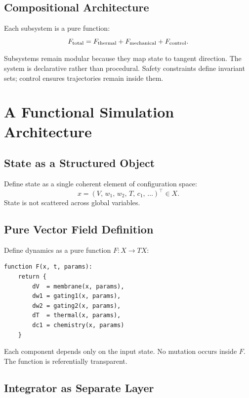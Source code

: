 \documentclass[12pt,openany]{book}
\begin{document}
\section{Compositional Architecture}

Each subsystem is a pure function:
\[
  F_{\rm total} = F_{\rm thermal} + F_{\rm mechanical} + F_{\rm control}.
\]

Subsystems remain modular because they map state to tangent direction.
The system is declarative rather than procedural. Safety constraints define
invariant sets; control ensures trajectories remain inside them.

\chapter{A Functional Simulation Architecture}
\label{ch:archit}

\section{State as a Structured Object}

Define state as a single coherent element of configuration space:
\[
  x = (V,\, w_1,\, w_2,\, T,\, c_1,\, \dots)^\top \in X.
\]
State is not scattered across global variables.

\section{Pure Vector Field Definition}

Define dynamics as a pure function $F:X\to TX$:

\begin{pseudocode}
\begin{lstlisting}
function F(x, t, params):
    return {
        dV  = membrane(x, params),
        dw1 = gating1(x, params),
        dw2 = gating2(x, params),
        dT  = thermal(x, params),
        dc1 = chemistry(x, params)
    }
\end{lstlisting}
\end{pseudocode}

Each component depends only on the input state. No mutation occurs inside $F$.
The function is referentially transparent.

\section{Integrator as Separate Layer}
\end{document}
